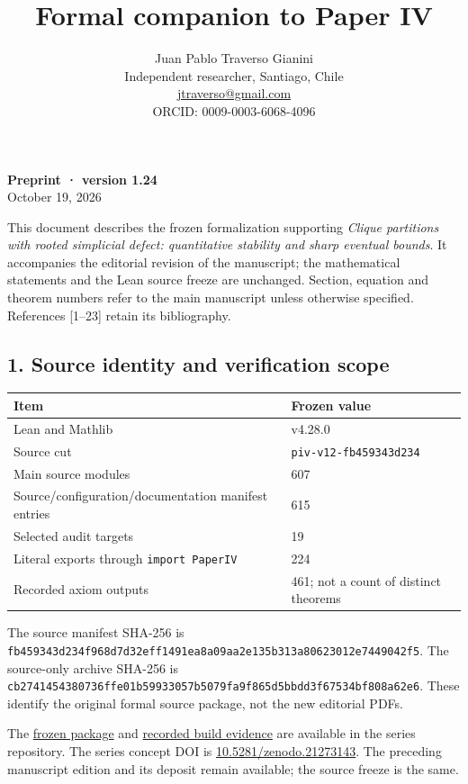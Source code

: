\documentclass[english,11pt,a4paper]{article}
\title{Formal companion to Paper IV}
\author{Juan Pablo Traverso Gianini\\\small Independent researcher, Santiago, Chile\\\small \href{mailto:jtraverso@gmail.com}{jtraverso@gmail.com}\\\small ORCID: 0009-0003-6068-4096}
\date{}
\newcounter{none}
\begin{document}
\raggedbottom
\maketitle
\textbf{Preprint · version 1.24}\\
October 19, 2026

This document describes the frozen formalization supporting \emph{Clique
partitions with rooted simplicial defect: quantitative stability and
sharp eventual bounds}. It accompanies the editorial revision of the
manuscript; the mathematical statements and the Lean source freeze are
unchanged. Section, equation and theorem numbers refer to the main
manuscript unless otherwise specified. References {[}1--23{]} retain its
bibliography.

\subsection{1. Source identity and verification
scope}\label{source-identity-and-verification-scope}

{\def\LTcaptype{none} %
\begin{longtable}[]{@{}ll@{}}
\toprule\noalign{}
Item & Frozen value \\
\midrule\noalign{}
\endhead
\bottomrule\noalign{}
\endlastfoot
Lean and Mathlib & v4.28.0 \\
Source cut & \nolinkurl{piv-v12-fb459343d234} \\
Main source modules & 607 \\
Source/configuration/documentation manifest entries & 615 \\
Selected audit targets & 19 \\
Literal exports through \texttt{import\ PaperIV} & 224 \\
Recorded axiom outputs & 461; not a count of distinct theorems \\
\end{longtable}
}

The source manifest SHA-256 is
\nolinkurl{fb459343d234f968d7d32eff1491ea8a09aa2e135b313a80623012e7449042f5}.
The source-only archive SHA-256 is
\nolinkurl{cb2741454380736ffe01b59933057b5079fa9f865d5bbdd3f67534bf808a62e6}.
These identify the original formal source package, not the new editorial
PDFs.

The
\href{https://github.com/jtraverso/erdos-81-chordal-clique-partitions/tree/ef31294ad67dfe3f44bc47cec4791c836f55e8aa/preprints/PAPER_IV/05_formalization}{frozen
package} and
\href{https://github.com/jtraverso/erdos-81-chordal-clique-partitions/tree/ef31294ad67dfe3f44bc47cec4791c836f55e8aa/preprints/PAPER_IV/03_reproducibility}{recorded
build evidence} are available in the series repository. The series
concept DOI is
\href{https://doi.org/10.5281/zenodo.21273143}{10.5281/zenodo.21273143}.
The preceding manuscript edition and its deposit remain available; the
source freeze is the same.
\end{document}
